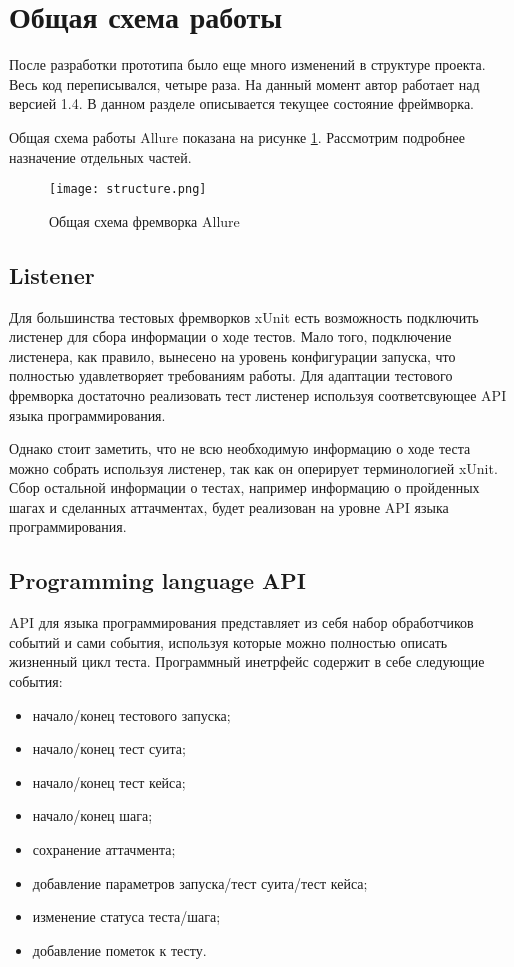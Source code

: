 \section{Общая схема работы} 

После разработки прототипа было еще много изменений в структуре проекта. Весь код переписывался, четыре раза. На данный момент автор работает над версией 1.4. В данном разделе описывается текущее состояние фреймворка.

Общая схема работы Allure показана на рисунке \ref{fig:allure}. Рассмотрим подробнее назначение отдельных частей.

\begin{figure}[htb]
\centering
\texttt{[image: structure.png]}
\caption{Общая схема фремворка Allure}
\label{fig:allure}
\end{figure}

\subsection{Listener}

Для большинства тестовых фремворков xUnit есть возможность подключить листенер для сбора информации о ходе тестов. Мало того, подключение листенера, как правило, вынесено на уровень конфигурации запуска, что полностью удавлетворяет требованиям работы. Для адаптации тестового фремворка достаточно реализовать тест листенер используя соответсвующее API языка программирования.

Однако стоит заметить, что не всю необходимую информацию о ходе теста можно собрать используя листенер, так как он оперирует терминологией xUnit. Сбор остальной информации о тестах, например информацию о пройденных шагах и сделанных аттачментах, будет реализован на уровне API языка программирования.

\subsection{Programming language API}

API для языка программирования представляет из себя набор обработчиков событий и сами события, используя которые можно полностью описать жизненный цикл теста. Программный инетрфейс содержит в себе следующие события:

\begin{itemize}
\item начало/конец тестового запуска;
\item начало/конец тест суита;
\item начало/конец тест кейса;
\item начало/конец шага;
\item сохранение аттачмента;
\item добавление параметров запуска/тест суита/тест кейса;
\item изменение статуса теста/шага;
\item добавление пометок к тесту.
\end{itemize}

